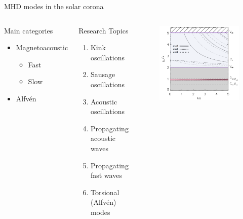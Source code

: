 \documentclass[11pt,table]{beamer}
\begin{document}
\begin{frame}{MHD modes in the solar corona}
    \begin{columns}
        \begin{block}{Main categories}
            \begin{itemize}
                \item Magnetoacoustic
                    \begin{itemize}
                        \item Fast %
                        \item Slow %
                    \end{itemize}
                \item Alfv\'en %
            \end{itemize}
        \end{block}
        \begin{block}{Research Topics}
            \begin{enumerate}
                \item Kink oscillations
                \item Sausage oscillations
                \item Acoustic oscillations
                \item Propagating acoustic waves
                \item Propagating fast waves
                \item Torsional (Alfv\'en) modes
            \end{enumerate}
        \end{block}
        \begin{block}{}
        \begin{figure}
            \vspace{-2em}
            \includegraphics[width=\textwidth]{disp_diagram.png}

\end{figure}
\end{block}
\end{columns}
\end{frame}
\end{document}
